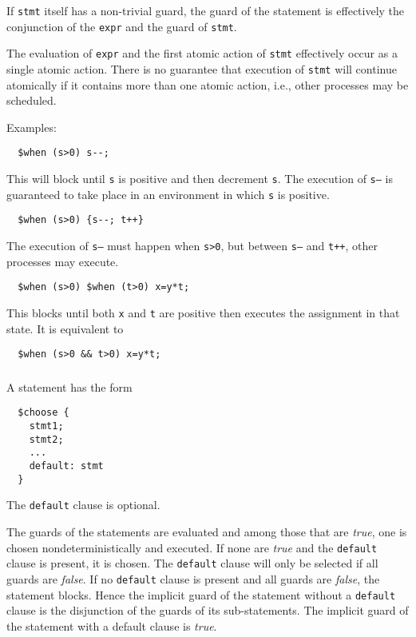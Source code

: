 \documentclass[11pt]{article}
\begin{document}
If \texttt{stmt} itself has a non-trivial guard, the guard of the
\cwhen{} statement is effectively the conjunction of the \texttt{expr}
and the guard of \texttt{stmt}.

The evaluation of \texttt{expr} and the first atomic action of
\texttt{stmt} effectively occur as a single atomic action.  There is
no guarantee that execution of \texttt{stmt} will continue atomically
if it contains more than one atomic action, i.e., other processes may
be scheduled.

Examples:
\begin{verbatim}
  $when (s>0) s--;
\end{verbatim}
This will block until \texttt{s} is positive and then decrement
\texttt{s}.  The execution of \texttt{s--} is guaranteed to take place
in an environment in which \texttt{s} is positive.

\begin{verbatim}
  $when (s>0) {s--; t++}
\end{verbatim}
The execution of \texttt{s--} must happen when \texttt{s>0}, but
between \texttt{s--} and \texttt{t++}, other processes may execute.

\begin{verbatim}
  $when (s>0) $when (t>0) x=y*t;
\end{verbatim}
This blocks until both \texttt{x} and \texttt{t} are positive then
executes the assignment in that state.  It is equivalent to
\begin{verbatim}
  $when (s>0 && t>0) x=y*t;
\end{verbatim}

\subsubsection{\cchoose}  A \cchoose{} statement has the form
\begin{verbatim}
  $choose {
    stmt1;
    stmt2;
    ...
    default: stmt
  }
\end{verbatim}
The \texttt{default} clause is optional.

The guards of the statements are evaluated and among those that are
\emph{true}, one is chosen nondeterministically and executed.  If none
are \emph{true} and the \texttt{default} clause is present, it is
chosen.  The \texttt{default} clause will only be selected if all
guards are \emph{false}.  If no \texttt{default} clause is present and
all guards are \emph{false}, the statement blocks.  Hence the implicit
guard of the \cchoose{} statement without a \texttt{default} clause is
the disjunction of the guards of its sub-statements.  The implicit
guard of the \cchoose{} statement with a default clause is
\emph{true}.
\end{document}

